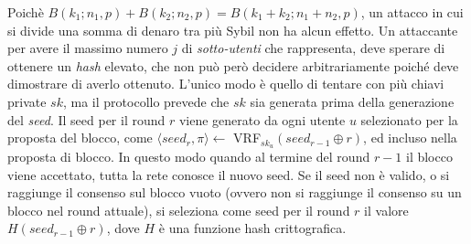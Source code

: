 Poichè $B(k_1; n_1, p) + B(k_2; n_2, p) = B(k_1+k_2; n_1 + n_2, p)$, un attacco in cui si divide una somma di denaro tra più Sybil non ha alcun effetto.
Un attaccante per avere il massimo numero $j$ di \emph{sotto-utenti} che rappresenta, deve sperare di ottenere un \emph{hash} elevato, che non può però decidere arbitrariamente poiché deve dimostrare di averlo ottenuto. L'unico modo è quello di tentare con più chiavi private $sk$, ma il protocollo prevede che $sk$ sia generata prima della generazione del \emph{seed}.
Il seed per il round $r$ viene generato da ogni utente $u$ selezionato per la proposta del blocco, come $\langle seed_r, \pi \rangle \leftarrow$ VRF$_{sk_u}(seed_{r-1} \oplus r)$, ed incluso nella proposta di blocco. In questo modo quando al termine del round $r-1$ il blocco viene accettato, tutta la rete conosce il nuovo seed. Se il seed non è valido, o si raggiunge il consenso sul blocco vuoto (ovvero non si raggiunge il consenso su un blocco nel round attuale), si seleziona come seed per il round $r$ il valore $H(seed_{r-1} \oplus r)$, dove $H$ è una funzione hash crittografica.

